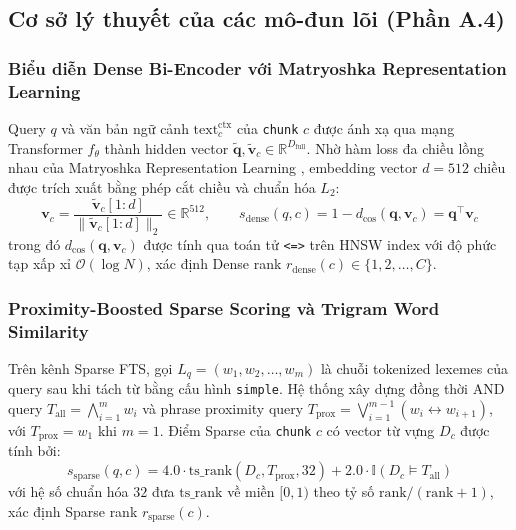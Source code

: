\subsection{Cơ sở lý thuyết của các mô-đun lõi (Phần A.4)}

\subsubsection{Biểu diễn Dense Bi-Encoder với Matryoshka Representation Learning}
Query $q$ và văn bản ngữ cảnh $\text{text}^{\text{ctx}}_c$ của \texttt{chunk} $c$ được ánh xạ qua mạng Transformer $f_{\theta}$ \cite{zhang2025qwen3} thành hidden vector $\tilde{\mathbf{q}}, \tilde{\mathbf{v}}_c \in \mathbb{R}^{D_{\text{full}}}$. Nhờ hàm loss đa chiều lồng nhau của Matryoshka Representation Learning \cite{kusupati2022mrl}, embedding vector $d = 512$ chiều được trích xuất bằng phép cắt chiều và chuẩn hóa $L_2$:
\begin{equation}
    \mathbf{v}_c = \frac{\tilde{\mathbf{v}}_c[1:d]}{\|\tilde{\mathbf{v}}_c[1:d]\|_2} \in \mathbb{R}^{512}, \qquad
    s_{\text{dense}}(q, c) = 1 - d_{\cos}(\mathbf{q}, \mathbf{v}_c) = \mathbf{q}^{\top} \mathbf{v}_c
    \label{eq:cosine}
\end{equation}
trong đó $d_{\cos}(\mathbf{q}, \mathbf{v}_c)$ được tính qua toán tử \texttt{<=>} trên HNSW index với độ phức tạp xấp xỉ $\mathcal{O}(\log N)$, xác định Dense rank $r_{\text{dense}}(c) \in \{1, 2, \dots, C\}$.

\subsubsection{Proximity-Boosted Sparse Scoring và Trigram Word Similarity}
Trên kênh Sparse FTS, gọi $L_q = (w_1, w_2, \dots, w_m)$ là chuỗi tokenized lexemes của query sau khi tách từ bằng cấu hình \texttt{simple}. Hệ thống xây dựng đồng thời AND query $T_{\text{all}} = \bigwedge_{i=1}^{m} w_i$ và phrase proximity query $T_{\text{prox}} = \bigvee_{i=1}^{m-1} (w_i \leftrightarrow w_{i+1})$, với $T_{\text{prox}} = w_1$ khi $m = 1$. Điểm Sparse của \texttt{chunk} $c$ có vector từ vựng $D_c$ được tính bởi:
\begin{equation}
    s_{\text{sparse}}(q, c) = 4.0 \cdot \text{ts\_rank}(D_c, T_{\text{prox}}, 32) + 2.0 \cdot \mathbb{I}(D_c \models T_{\text{all}})
    \label{eq:sparse}
\end{equation}
với hệ số chuẩn hóa $32$ đưa $\text{ts\_rank}$ về miền $[0, 1)$ theo tỷ số $\text{rank}/(\text{rank}+1)$, xác định Sparse rank $r_{\text{sparse}}(c)$.

